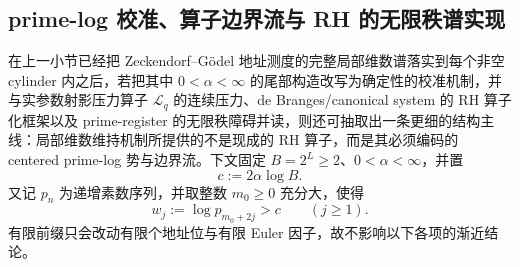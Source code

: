 \subsection{prime-log 校准、算子边界流与 RH 的无限秩谱实现}\label{subsec:conclusion-prime-log-calibration-boundary-current-rh}
在上一小节已经把 Zeckendorf--Gödel 地址测度的完整局部维数谱落实到每个非空 cylinder 内之后，若把其中 \(0<\alpha<\infty\) 的尾部构造改写为确定性的校准机制，并与实参数射影压力算子 \(\mathcal L_q\) 的连续压力、de Branges/canonical system 的 RH 算子化框架以及 prime-register 的无限秩障碍并读，则还可抽取出一条更细的结构主线：局部维数维持机制所提供的不是现成的 RH 算子，而是其必须编码的 centered prime-log 势与边界流。下文固定 \(B=2^L\ge 2\)、\(0<\alpha<\infty\)，并置
\[
c:=2\alpha\log B.
\]
又记 \(p_n\) 为递增素数序列，并取整数 \(m_0\ge 0\) 充分大，使得
\[
w_j:=\log p_{m_0+2j}>c
\qquad (j\ge 1).
\]
有限前缀只会改动有限个地址位与有限 Euler 因子，故不影响以下各项的渐近结论。

